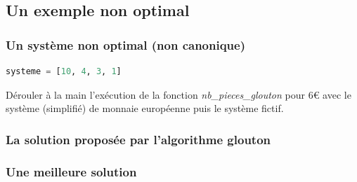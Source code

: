\documentclass[svgnames,11pt]{beamer}
\begin{document}
\subsection{Un exemple non optimal}
\begin{frame}[fragile]
    \frametitle{Un système non optimal (non canonique)}

    \begin{center}
        \begin{lstlisting}[language=Python]
systeme = [10, 4, 3, 1]
        \end{lstlisting}
        \label{systeme}
    \end{center}
    \begin{activite}
        Dérouler à la main l'exécution de la fonction \emph{nb\_pieces\_glouton} pour 6€ avec le système (simplifié) de monnaie européenne puis le système fictif.
    \end{activite}
\end{frame}


\begin{frame}
    \frametitle{La solution proposée par l'algorithme glouton}

    \begin{center}
        \label{moncode}
    \end{center}

\end{frame}
\begin{frame}
    \frametitle{Une meilleure solution}

    \begin{center}
        \label{moncode}
    \end{center}

\end{frame}
\end{document}
